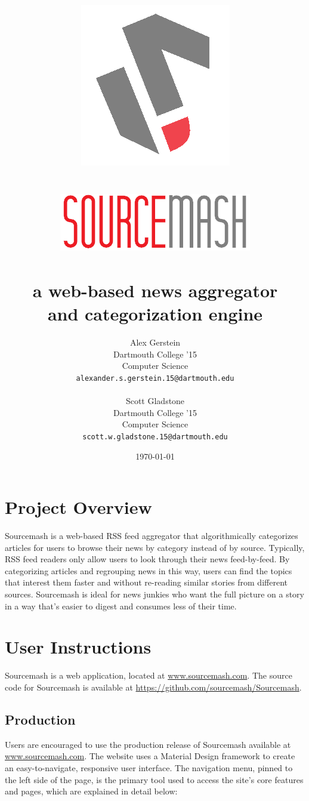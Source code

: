 \documentclass[11pt]{article}
\title{\includegraphics[scale=0.65]{solologo} \\~\\ \includegraphics[scale=0.75]{logotext} \\~\\ \textbf{a web-based news aggregator \\ and categorization engine}}
\author{
	Alex Gerstein \\ Dartmouth College '15 \\ Computer Science \\ \texttt{alexander.s.gerstein.15@dartmouth.edu}
	\\ \\
	Scott Gladstone \\ Dartmouth College '15 \\ Computer Science \\ \texttt{scott.w.gladstone.15@dartmouth.edu}
	}
\date{\today}
\begin{document}
\maketitle


\pagebreak
\section{Project Overview}

Sourcemash is a web-based RSS feed aggregator that algorithmically categorizes articles for users to browse their news by category instead of by source. Typically, RSS feed readers only allow users to look through their news feed-by-feed. By categorizing articles and regrouping news in this way, users can find the topics that interest them faster and without re-reading similar stories from different sources. Sourcemash is ideal for news junkies who want the full picture on a story in a way that's easier to digest and consumes less of their time.


\section{User Instructions}

Sourcemash is a web application, located at \url{www.sourcemash.com}. The source code for Sourcemash is available at \url{https://github.com/sourcemash/Sourcemash}.

\subsection{Production}

Users are encouraged to use the production release of Sourcemash available at \url{www.sourcemash.com}. The website uses a Material Design framework\cite{Materialize} to create an easy-to-navigate, responsive user interface. The navigation menu, pinned to the left side of the page, is the primary tool used to access the site's core features and pages, which are explained in detail below:
\end{document}
